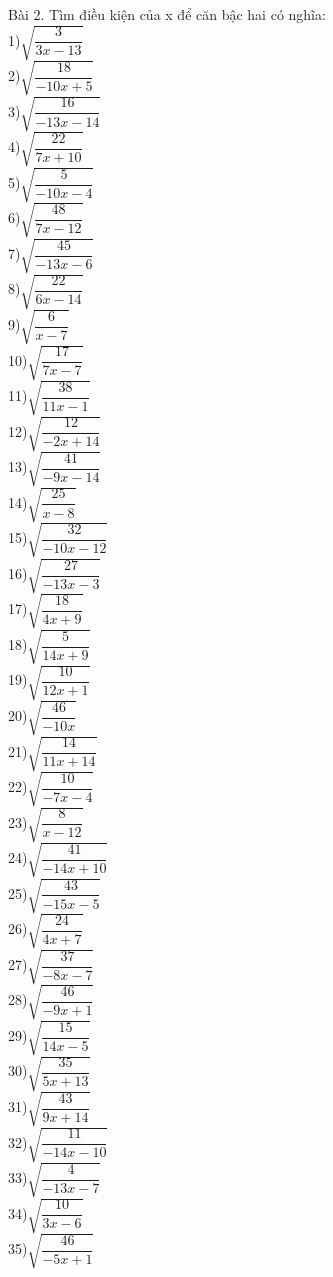 \documentclass[12pt,a4paper]{article}
\begin{document}
Bài 2. Tìm điều kiện của x để căn bậc hai có nghĩa:\\
1)$\sqrt{\dfrac{3}{3x-13}}$\\
2)$\sqrt{\dfrac{18}{-10x+5}}$\\
3)$\sqrt{\dfrac{16}{-13x-14}}$\\
4)$\sqrt{\dfrac{22}{7x+10}}$\\
5)$\sqrt{\dfrac{5}{-10x-4}}$\\
6)$\sqrt{\dfrac{48}{7x-12}}$\\
7)$\sqrt{\dfrac{45}{-13x-6}}$\\
8)$\sqrt{\dfrac{22}{6x-14}}$\\
9)$\sqrt{\dfrac{6}{x-7}}$\\
10)$\sqrt{\dfrac{17}{7x-7}}$\\
11)$\sqrt{\dfrac{38}{11x-1}}$\\
12)$\sqrt{\dfrac{12}{-2x+14}}$\\
13)$\sqrt{\dfrac{41}{-9x-14}}$\\
14)$\sqrt{\dfrac{25}{x-8}}$\\
15)$\sqrt{\dfrac{32}{-10x-12}}$\\
16)$\sqrt{\dfrac{27}{-13x-3}}$\\
17)$\sqrt{\dfrac{18}{4x+9}}$\\
18)$\sqrt{\dfrac{5}{14x+9}}$\\
19)$\sqrt{\dfrac{10}{12x+1}}$\\
20)$\sqrt{\dfrac{46}{-10x}}$\\
21)$\sqrt{\dfrac{14}{11x+14}}$\\
22)$\sqrt{\dfrac{10}{-7x-4}}$\\
23)$\sqrt{\dfrac{8}{x-12}}$\\
24)$\sqrt{\dfrac{41}{-14x+10}}$\\
25)$\sqrt{\dfrac{43}{-15x-5}}$\\
26)$\sqrt{\dfrac{24}{4x+7}}$\\
27)$\sqrt{\dfrac{37}{-8x-7}}$\\
28)$\sqrt{\dfrac{46}{-9x+1}}$\\
29)$\sqrt{\dfrac{15}{14x-5}}$\\
30)$\sqrt{\dfrac{35}{5x+13}}$\\
31)$\sqrt{\dfrac{43}{9x+14}}$\\
32)$\sqrt{\dfrac{11}{-14x-10}}$\\
33)$\sqrt{\dfrac{4}{-13x-7}}$\\
34)$\sqrt{\dfrac{10}{3x-6}}$\\
35)$\sqrt{\dfrac{46}{-5x+1}}$\\
\end{document}
